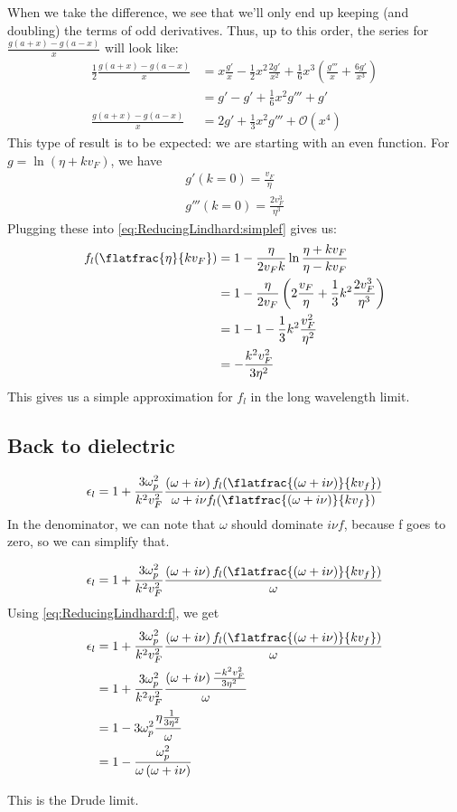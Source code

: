 \documentclass[../../main.tex]{subfiles}
\newcommand{\vf}{v_F}
\begin{document}
When we take the difference, we see that we'll only end up keeping (and doubling) the terms of odd derivatives. Thus, up to this order, the series for $\frac{g(a + x) - g(a - x)}{x}$ will look like:
\begin{align}
	\frac12 \frac{g(a + x) - g(a - x)}{x} &= x \frac{g'}{x} - \frac12 x^2 \frac{2 g'}{x^2} + \frac16 x^3 \left( \frac{g'''}{x} + \frac{6 g'}{x^3} \right) \\
	&= g' - g' + \frac16 x^2 g''' + g' \\
	\frac{g(a + x) - g(a - x)}{x} &= 2g' + \frac13 x^2 g''' + \mathcal{O}(x^4)
\end{align}
This type of result is to be expected: we are starting with an even function. For $g = \ln(\eta + k \vf)$, we have
\begin{align}
	g'(k = 0) = \frac{\vf}{\eta} \\
	g'''(k = 0) = \frac{2 \vf^3}{\eta^3}
\end{align}
Plugging these into \eqref{eq:ReducingLindhard:simplef} gives us:
\begin{align}
	f_l(\flatfrac{\eta}{k \vf}) &= 1 - \frac{\eta}{2 \vf k} \ln\frac{\eta + k \vf}{\eta - k\vf} \\
	&= 1- \frac{\eta}{2\vf} \left( 2 \frac{\vf}{\eta} + \frac13 k^2 \frac{2 \vf^3}{\eta^3} \right) \\
	&= 1 - 1 - \frac13 k^2 \frac{\vf^2}{\eta^2}	\\
	&= - \frac{k^2 \vf^2}{3 \eta^2} \label{eq:ReducingLindhard:f}
\end{align}
This gives us a simple approximation for $f_l$ in the long wavelength limit.

\subsection{Back to dielectric}
\begin{equation} \label{eq:ReducingLindhard:EpsWithF} 
 \epsilon_l = 1 + \frac{3 \omega_p^2}{k^2 v_F^2} \frac{\left(\omega + i \nu \right) f_l(\flatfrac{(\omega + i \nu)}{k v_f})}{\omega + i \nu f_l(\flatfrac{(\omega + i \nu)}{k v_f})}
\end{equation}
In the denominator, we can note that $\omega$ should dominate $i \nu f$, because f goes to zero, so we can simplify that. 

\begin{equation}
	 \epsilon_l = 1 + \frac{3 \omega_p^2}{k^2 v_F^2} \frac{\left(\omega + i \nu \right) f_l(\flatfrac{(\omega + i \nu)}{k v_f})}{\omega}
\end{equation}
Using \eqref{eq:ReducingLindhard:f}, we get
\begin{align}
	\epsilon_l &= 1 + \frac{3 \omega_p^2}{k^2 v_F^2} \frac{\left(\omega + i \nu \right) f_l(\flatfrac{(\omega + i \nu)}{k v_f})}{\omega} \\
	&= 1 + \frac{3 \omega_p^2}{k^2 v_F^2} \frac{\left(\omega + i \nu \right) \frac{-k^2 \vf^2}{3 \eta^2}}{\omega} \\
	&= 1 - 3 \omega_p^2 \frac{\eta \frac{1}{ 3\eta^2}}{\omega} \\
	&= 1 - \frac{ \omega_p^2}{\omega \left( \omega + i \nu \right)}
\end{align}

This is the Drude limit.
\end{document}
